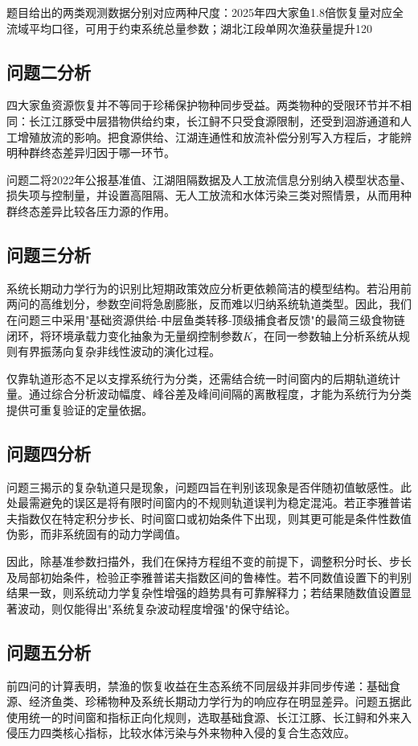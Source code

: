 \documentclass{MMCStyle}
\begin{document}
题目给出的两类观测数据分别对应两种尺度：2025年四大家鱼1.8倍恢复量对应全流域平均口径，可用于约束系统总量参数；湖北江段单网次渔获量提升120%

\subsection{问题二分析}
四大家鱼资源恢复并不等同于珍稀保护物种同步受益。两类物种的受限环节并不相同：长江江豚受中层猎物供给约束，长江鲟不只受食源限制，还受到洄游通道和人工增殖放流的影响。把食源供给、江湖连通性和放流补偿分别写入方程后，才能辨明种群终态差异归因于哪一环节。

问题二将2022年公报基准值、江湖阻隔数据及人工放流信息分别纳入模型状态量、损失项与控制量，并设置高阻隔、无人工放流和水体污染三类对照情景，从而用种群终态差异比较各压力源的作用。

\subsection{问题三分析}
系统长期动力学行为的识别比短期政策效应分析更依赖简洁的模型结构。若沿用前两问的高维划分，参数空间将急剧膨胀，反而难以归纳系统轨道类型。因此，我们在问题三中采用"基础资源供给-中层鱼类转移-顶级捕食者反馈"的最简三级食物链闭环，将环境承载力变化抽象为无量纲控制参数$K$，在同一参数轴上分析系统从规则有界振荡向复杂非线性波动的演化过程。

仅靠轨道形态不足以支撑系统行为分类，还需结合统一时间窗内的后期轨道统计量。通过综合分析波动幅度、峰谷差及峰间间隔的离散程度，才能为系统行为分类提供可重复验证的定量依据。

\subsection{问题四分析}
问题三揭示的复杂轨道只是现象，问题四旨在判别该现象是否伴随初值敏感性。此处最需避免的误区是将有限时间窗内的不规则轨道误判为稳定混沌。若正李雅普诺夫指数仅在特定积分步长、时间窗口或初始条件下出现，则其更可能是条件性数值伪影，而非系统固有的动力学阈值。

因此，除基准参数扫描外，我们在保持方程组不变的前提下，调整积分时长、步长及局部初始条件，检验正李雅普诺夫指数区间的鲁棒性。若不同数值设置下的判别结果一致，则系统动力学复杂性增强的趋势具有可靠解释力；若结果随数值设置显著波动，则仅能得出"系统复杂波动程度增强"的保守结论。

\subsection{问题五分析}
前四问的计算表明，禁渔的恢复收益在生态系统不同层级并非同步传递：基础食源、经济鱼类、珍稀物种及系统长期动力学行为的响应存在明显差异。问题五据此使用统一的时间窗和指标正向化规则，选取基础食源、长江江豚、长江鲟和外来入侵压力四类核心指标，比较水体污染与外来物种入侵的复合生态效应。
\end{document}
